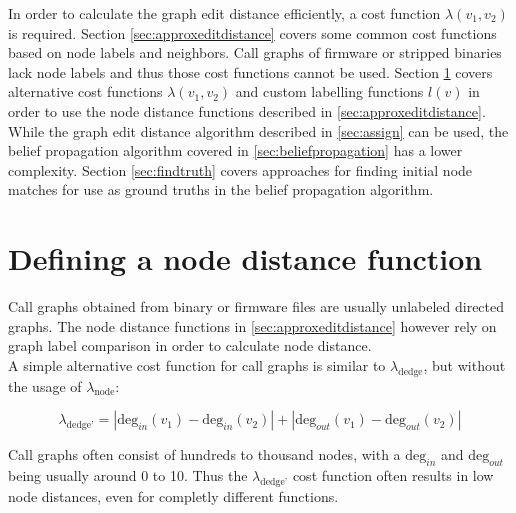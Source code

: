 \documentclass[
    12pt,                               %
    DIV=14,                     %
    parskip=half+,              %
    bigheadings,                %
    cleardoubleempty,   %
    halfparskip,                %
    ]{scrreprt} %
\begin{document}
In order to calculate the graph edit distance efficiently, a cost function $\lambda(v_1, v_2)$ is required. Section \ref{sec:approxeditdistance} covers some common cost functions based on node labels and neighbors. Call graphs of firmware or stripped binaries lack node labels and thus those cost functions cannot be used. Section \ref{sec:customattributes} covers alternative cost functions $\lambda(v_1, v_2)$ and custom labelling functions $l(v)$ in order to use the node distance functions described in \ref{sec:approxeditdistance}. \\
While the graph edit distance algorithm described in \ref{sec:assign} can be used, the belief propagation algorithm covered in \ref{sec:beliefpropagation} has a lower complexity. Section \ref{sec:findtruth} covers approaches for finding initial node matches for use as ground truths in the belief propagation algorithm.

\section{Defining a node distance function} \label{sec:customattributes}
Call graphs obtained from binary or firmware files are usually unlabeled directed graphs. The node distance functions in \ref{sec:approxeditdistance} however rely on graph label comparison in order to calculate node distance. \\
A simple alternative cost function for call graphs is similar to $\lambda_{\text{dedge}}$, but without the usage of $\lambda_{\text{node}}$:

\begin{equation}
	\lambda_{\text{dedge'}} = |\text{deg}_{in}(v_1) - \text{deg}_{in}(v_2)| + |\text{deg}_{out}(v_1) - \text{deg}_{out}(v_2)|
\end{equation}

Call graphs often consist of hundreds to thousand nodes, with a $\text{deg}_{in}$ and $\text{deg}_{out}$ being usually around 0 to 10. Thus the $\lambda_{\text{dedge'}}$ cost function often results in low node distances, even for completly different functions.
\end{document}
